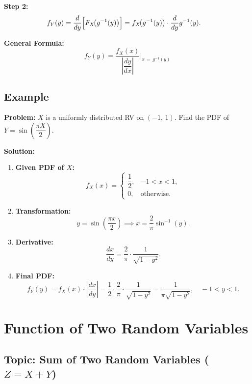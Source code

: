 \documentclass{article}
\begin{document}
\textbf{Step 2:}
\begin{align}
    f_Y(y) &= \frac{d}{dy}\Bigl[F_X\!\bigl(g^{-1}(y)\bigr)\Bigr]
             = f_X\!\bigl(g^{-1}(y)\bigr)\cdot\frac{d}{dy}g^{-1}(y).
\end{align}

\textbf{General Formula:}
\begin{equation}
    \boxed{f_Y(y) = \frac{f_X(x)}{\left|\dfrac{dy}{dx}\right|}
    \Bigg|_{x \,=\, g^{-1}(y)}}
\end{equation}

\subsection*{Example}

\textbf{Problem:} $X$ is a uniformly distributed RV on $(-1,\,1)$. 
Find the PDF of $Y = \sin\!\left(\dfrac{\pi X}{2}\right)$.

\textbf{Solution:}
\begin{enumerate}
    \item \textbf{Given PDF of $X$:}
    \[
        f_X(x) = \begin{cases} \dfrac{1}{2}, & -1 < x < 1, \\ 0, & \text{otherwise.} \end{cases}
    \]

    \item \textbf{Transformation:}
    \[
        y = \sin\!\left(\frac{\pi x}{2}\right)
        \implies
        x = \frac{2}{\pi}\sin^{-1}(y).
    \]

    \item \textbf{Derivative:}
    \[
        \frac{dx}{dy} = \frac{2}{\pi}\cdot\frac{1}{\sqrt{1-y^2}}.
    \]

    \item \textbf{Final PDF:}
    \[
        f_Y(y) = f_X(x)\cdot\left|\frac{dx}{dy}\right|
               = \frac{1}{2}\cdot\frac{2}{\pi}\cdot\frac{1}{\sqrt{1-y^2}}
               = \frac{1}{\pi\sqrt{1-y^2}},
               \quad -1 < y < 1.
    \]
\end{enumerate}

\section{Function of Two Random Variables}

\subsection*{Topic: Sum of Two Random Variables ($Z = X + Y$)}
\end{document}
